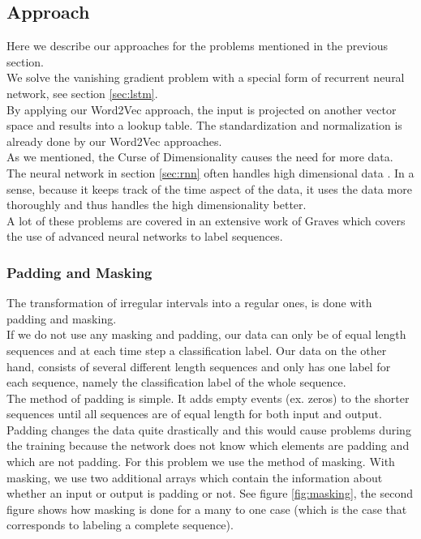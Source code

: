 \subsection{Approach}

Here we describe our approaches for the problems mentioned in the previous section. \\
We solve the vanishing gradient problem with a special form of recurrent neural network, see section \ref{sec:lstm}. \\
By applying our Word2Vec approach, the input is projected on another vector space and results into a lookup table. The standardization and normalization is already done by our Word2Vec approaches. \\
As we mentioned, the Curse of Dimensionality causes the need for more data. The neural network in section \ref{sec:rnn} often handles high dimensional data \cite{nn1:article} \cite{nn2:article} \cite{nn3:article} \cite{nn4:article}. In a sense, because it keeps track of the time aspect of the data, it uses the data more thoroughly and thus handles the high dimensionality better. \\

A lot of these problems are covered in an extensive work of Graves \cite{gravesLstm:thesis} which covers the use of advanced neural networks to label sequences.

\subsubsection{Padding and Masking}
The transformation of irregular intervals into a regular ones, is done with padding and masking. \\

If we do not use any masking and padding, our data can only be of equal length sequences and at each time step a classification label. Our data on the other hand, consists of several different length sequences and only has one label for each sequence, namely the classification label of the whole sequence. \\

The method of padding is simple. It adds empty events (ex. zeros) to the shorter sequences until all sequences are of equal length for both input and output. \\
Padding changes the data quite drastically and this would cause problems during the training because the network does not know which elements are padding and which are not padding. For this problem we use the method of masking. With masking, we use two additional arrays which contain the information about whether an input or output is padding or not. See figure \ref{fig:masking}, the second figure shows how masking is done for a many to one case (which is the case that corresponds to labeling a complete sequence). 

